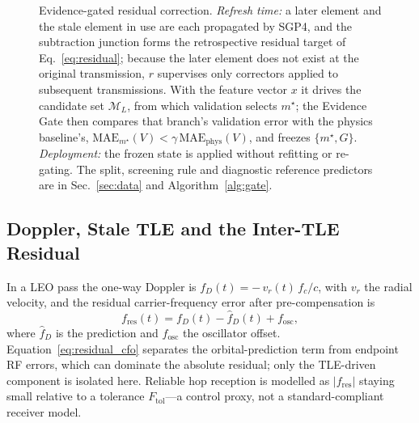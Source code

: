 \documentclass[conference]{IEEEtran}
\begin{document}
\begin{figure}[!t]
{}
\caption{Evidence-gated residual correction. \emph{Refresh time:} a later element
and the stale element in use are each propagated by SGP4, and the subtraction
junction forms the retrospective residual target of Eq.~\eqref{eq:residual};
because the later element does not exist at the original transmission, $r$
supervises only correctors applied to subsequent transmissions. With the feature
vector $x$ it drives the candidate set $\mathcal{M}_L$, from which validation selects
$m^{\star}$; the Evidence Gate then compares that branch's validation error with
the physics baseline's, $\mathrm{MAE}_{m^{\star}}(V)<\gamma\,\mathrm{MAE}_{\mathrm{phys}}(V)$,
and freezes $\{m^{\star},G\}$. \emph{Deployment:} the frozen state is applied
without refitting or re-gating. The split, screening rule and diagnostic reference
predictors are in Sec.~\ref{sec:data} and Algorithm~\ref{alg:gate}.}
\label{fig:architecture}
\end{figure}

\subsection{Doppler, Stale TLE and the Inter-TLE Residual}
In a LEO pass the one-way Doppler is $f_D(t) = -\,v_r(t)\,f_c/c$, with $v_r$ the
radial velocity, and the residual carrier-frequency error after
pre-compensation is
\begin{equation}
f_{\mathrm{res}}(t) = f_D(t) - \hat{f}_D(t) + f_{\mathrm{osc}},
\label{eq:residual_cfo}
\end{equation}
where $\hat f_D$ is the prediction and $f_{\mathrm{osc}}$ the oscillator offset.
Equation~\eqref{eq:residual_cfo} separates the orbital-prediction term from
endpoint RF errors, which can dominate the absolute residual; only the
TLE-driven component is isolated here. Reliable hop reception is modelled as
$|f_{\mathrm{res}}|$ staying small relative to a tolerance
$F_{\mathrm{tol}}$---a control proxy, not a standard-compliant receiver model.
\end{document}
